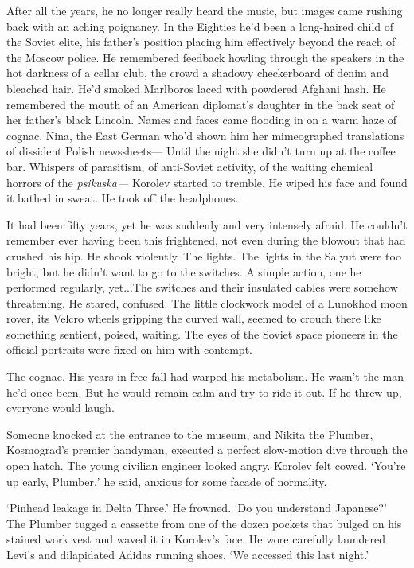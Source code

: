 After all the years, he no longer really heard the music, but images came rushing back with an aching poignancy. In the Eighties he'd been a long-haired child of the Soviet elite, his father's position placing him effectively beyond the reach of the Moscow police. He remembered feedback howling through the speakers in the hot darkness of a cellar club, the crowd a shadowy checkerboard of denim and bleached hair. He'd smoked Marlboros laced with powdered Afghani hash. He remembered the mouth of an American diplomat's daughter in the back seat of her father's black Lincoln. Names and faces came flooding in on a warm haze of cognac. Nina, the East German who'd shown him her mimeographed translations of dissident Polish newssheets--- Until the night she didn't turn up at the coffee bar. Whispers of parasitism, of anti-Soviet activity, of the waiting chemical horrors of the \textit{psikuska---} Korolev started to tremble. He wiped his face and found it bathed in sweat. He took off the headphones.

It had been fifty years, yet he was suddenly and very intensely afraid. He couldn't remember ever having been this frightened, not even during the blowout that had crushed his hip. He shook violently. The lights. The lights in the Salyut were too bright, but he didn't want to go to the switches. A simple action, one he performed regularly, yet...The switches and their insulated cables were somehow threatening. He stared, confused. The little clockwork model of a Lunokhod moon rover, its Velcro wheels gripping the curved wall, seemed to crouch there like something sentient, poised, waiting. The eyes of the Soviet space pioneers in the official portraits were fixed on him with contempt.

The cognac. His years in free fall had warped his metabolism. He wasn't the man he'd once been. But he would remain calm and try to ride it out. If he threw up, everyone would laugh.

Someone knocked at the entrance to the museum, and Nikita the Plumber, Kosmograd's premier handyman, executed a perfect slow-motion dive through the open hatch. The young civilian engineer looked angry. Korolev felt cowed. `You're up early, Plumber,' he said, anxious for some facade of normality.

`Pinhead leakage in Delta Three.' He frowned. `Do you understand Japanese?' The Plumber tugged a cassette from one of the dozen pockets that bulged on his stained work vest and waved it in Korolev's face. He wore carefully laundered Levi's and dilapidated Adidas running shoes. `We accessed this last night.'

